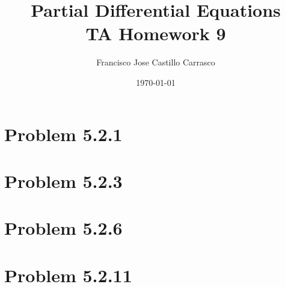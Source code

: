 




\title{Partial Differential Equations\\TA Homework 9}
\author{Francisco Jose Castillo Carrasco}
\date{\today}
\maketitle




\section*{Problem 5.2.1}

\newpage
\section*{Problem 5.2.3}

\newpage
\section*{Problem 5.2.6}

\section*{Problem 5.2.11}


